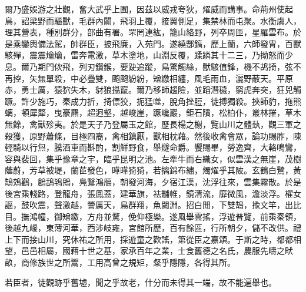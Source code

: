 \begin{pinyinscope}
爾乃盛娛游之壯觀，奮大武乎上囿，因茲以威戎夸狄，燿威而講事。命荊州使起鳥，詔梁野而驅獸，毛群內闐，飛羽上覆，接翼側足，集禁林而屯聚。水衡虞人，理其營表，種別群分，部曲有署。罘罔連紘，籠山絡野，列卒周匝，星羅雲布。於是乘鑾輿備法駕，帥群臣，披飛廉，入苑門。遂繞酆鎬，歷上蘭，六師發冑，百獸駭殫，震震爚爚，雷奔電激，草木塗地，山淵反覆，蹂蹸其十二三，乃拗怒而少息。爾乃期門佽飛，列刃鑽鍭，要趹追蹤，鳥驚觸絲，獸駭值鋒，機不鸪掎，弦不再控，矢無單殺，中必疊雙，颮颮紛紛，矰繳相纏，風毛雨血，灑野蔽天。平原赤，勇士厲，猿狖失木，豺狼攝竄。爾乃移師趨險，並蹈潛穢，窮虎奔突，狂兕觸蹶。許少施巧，秦成力折，掎僄狡，扼猛噬，脫角挫脰，徒搏獨殺。挾師豹，拖熊螭，頓犀犛，曳豪羆，超迥壑，越峻崖，蹶巉巖，鉅石隤，松柏仆，叢林摧，草木無餘，禽獸殄夷。於是天子乃登屬玉之館，歷長楊之榭，覽山川之體埶，觀三軍之殺獲，原野蕭條，目極四裔，禽相鎮厭，獸相枕藉。然後收禽會眾，論功賜胙，陳輕騎以行炰，騰酒車而斟酌，割鮮野食，舉燧命爵。饗賜畢，勞逸齊，大輅鳴鸞，容與裴回，集乎豫章之宇，臨乎昆明之池。左牽牛而右織女，似雲漢之無崖，茂樹蔭蔚，芳草被堤，蘭茞發色，曄曄猗猗，若摛錦布繡，燭燿乎其陂。玄鶴白鷺，黃鵠鵁鸛，鶬鴰鴇鶂，鳧鷖鴻鴈，朝發河海，夕宿江漢，沈浮往來，雲集霧散。於是後宮乘輚路，登龍舟，張鳳蓋，建華旗，袪黼帷，鏡清流，靡微風，澹淡浮。櫂女謳，鼓吹震，聲激越，謍厲天，鳥群翔，魚闚淵。招白閒，下雙鵠，揄文竿，出比目。撫鴻幢，御矰繳，方舟並騖，俛仰極樂。遂風舉雲搖，浮遊普覽，前乘秦領，後越九嵕，東薄河華，西涉岐雍，宮館所歷，百有餘區，行所朝夕，儲不改供。禮上下而接山川，究休祐之所用，採遊童之歡謠，第從臣之嘉頌。于斯之時，都都相望，邑邑相屬，國藉十世之基，家承百年之業，士食舊德之名氏，農服先疇之畎畝，商修族世之所鬻，工用高曾之規矩，粲乎隱隱，各得其所。

若臣者，徒觀跡乎舊墟，聞之乎故老，什分而未得其一端，故不能遍舉也。


\end{pinyinscope}
